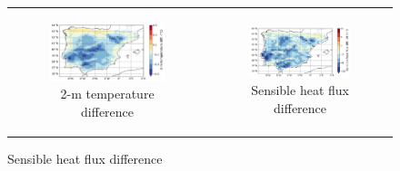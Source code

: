 \begin{figure}[htbp]
    \centering
    \begin{tabular}{cc}
        \begin{subfigure}[b]{0.5\textwidth}
            \caption{2-m temperature difference}
            \includegraphics[width=\textwidth]{images/chap4/future/diffmap_t2m_futirr.png}
        \end{subfigure} &
        \begin{subfigure}[b]{0.5\textwidth}
            \caption{Sensible heat flux difference}
            \includegraphics[width=\textwidth]{images/chap4/future/diffmap_fluxsens_futirr.png}
        \end{subfigure} \\


\end{tabular}
\end{figure}
